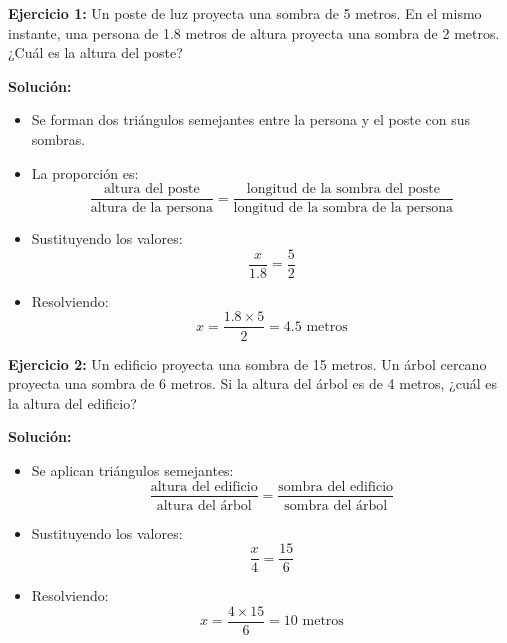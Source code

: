 \documentclass{profesor}
\begin{document}
\textbf{Ejercicio 1:}  
Un poste de luz proyecta una sombra de 5 metros. En el mismo instante, una persona de 1.8 metros de altura proyecta una sombra de 2 metros. ¿Cuál es la altura del poste?

\textbf{Solución:}  
\begin{itemize}
    \item Se forman dos triángulos semejantes entre la persona y el poste con sus sombras.
    \item La proporción es:
    \[
    \frac{\text{altura del poste}}{\text{altura de la persona}} = \frac{\text{longitud de la sombra del poste}}{\text{longitud de la sombra de la persona}}
    \]
    \item Sustituyendo los valores:
    \[
    \frac{x}{1.8} = \frac{5}{2}
    \]
    \item Resolviendo:
    \[
    x = \frac{1.8 \times 5}{2} = 4.5 \text{ metros}
    \]
\end{itemize}

\textbf{Ejercicio 2:}  
Un edificio proyecta una sombra de 15 metros. Un árbol cercano proyecta una sombra de 6 metros. Si la altura del árbol es de 4 metros, ¿cuál es la altura del edificio?

\textbf{Solución:}  
\begin{itemize}
    \item Se aplican triángulos semejantes:
    \[
    \frac{\text{altura del edificio}}{\text{altura del árbol}} = \frac{\text{sombra del edificio}}{\text{sombra del árbol}}
    \]
    \item Sustituyendo los valores:
    \[
    \frac{x}{4} = \frac{15}{6}
    \]
    \item Resolviendo:
    \[
    x = \frac{4 \times 15}{6} = 10 \text{ metros}
    \]
\end{itemize}
\end{document}
